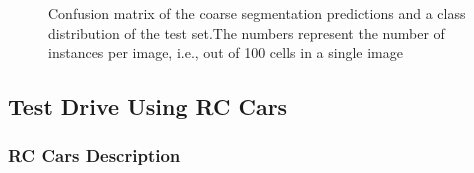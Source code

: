 \documentclass{ctuthesis/ctuthesis}
\begin{document}
\begin{figure}[h]
    \centering
    \quad
    \caption[Confusion matrix of the coarse segmentation predictions and a class distribution of the test set]{Confusion matrix of the coarse segmentation predictions and a class distribution of the test set.The numbers represent the number of instances per image, i.e., out of 100 cells in a single image}
    \label{fig:segmentation_results}%
\end{figure}



\subsection{Test Drive Using RC Cars}
\subsubsection{RC Cars Description}
\end{document}
